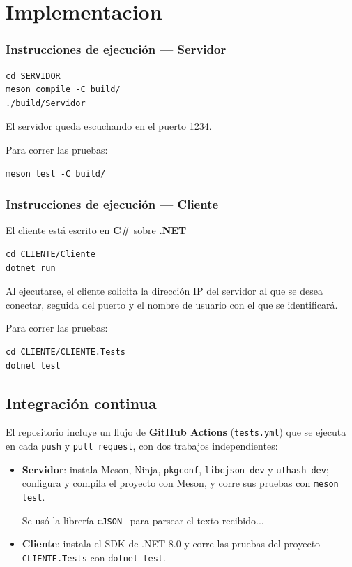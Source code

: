\documentclass{article}
\begin{document}
\section{Implementacion}
\label{sec:implementacion}
\subsubsection{Instrucciones de ejecución — Servidor}

\begin{verbatim}
cd SERVIDOR
meson compile -C build/
./build/Servidor
\end{verbatim}

El servidor queda escuchando en el puerto 1234.

Para correr las pruebas:
\begin{verbatim}
meson test -C build/
\end{verbatim}

\subsubsection{Instrucciones de ejecución — Cliente}
El cliente está escrito en \textbf{C\#} sobre \textbf{.NET}~\cite{dotnet}
\begin{verbatim}
cd CLIENTE/Cliente
dotnet run
\end{verbatim}

Al ejecutarse, el cliente solicita la dirección IP del servidor al que se
desea conectar, seguida del puerto y el nombre de usuario con el que se
identificará.

Para correr las pruebas:
\begin{verbatim}
cd CLIENTE/CLIENTE.Tests
dotnet test
\end{verbatim}

\subsection{Integración continua}

El repositorio incluye un flujo de \textbf{GitHub Actions} (\texttt{tests.yml})
que se ejecuta en cada \texttt{push} y \texttt{pull request}, con dos trabajos
independientes:

\begin{itemize}
    \item \textbf{Servidor}: instala Meson, Ninja, \texttt{pkgconf},
    \texttt{libcjson-dev} y \texttt{uthash-dev}; configura y compila el
    proyecto con Meson, y corre sus pruebas con \texttt{meson test}.

    Se usó la librería \texttt{cJSON}~\cite{cjson} para parsear el texto recibido...
    
    \item \textbf{Cliente}: instala el SDK de .NET 8.0 y corre las pruebas
    del proyecto \texttt{CLIENTE.Tests} con \texttt{dotnet test}.
\end{itemize}
\end{document}
